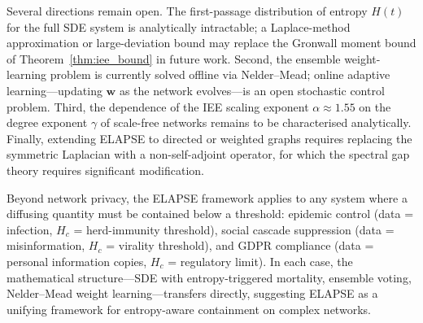 Several directions remain open. The first-passage distribution of entropy
$H(t)$ for the full SDE system is analytically
intractable; a Laplace-method approximation or large-deviation bound
may replace the Gronwall moment bound of Theorem~\ref{thm:iee_bound} in
future work.
Second, the ensemble weight-learning problem is currently solved offline
via Nelder--Mead; online adaptive learning---updating $\mathbf{w}$ as
the network evolves---is an open stochastic control problem.
Third, the dependence of the IEE scaling exponent $\alpha \approx 1.55$ on
the degree exponent $\gamma$ of scale-free networks remains to be characterised
analytically.
Finally, extending ELAPSE to directed or weighted graphs requires replacing
the symmetric Laplacian with a non-self-adjoint operator, for which the
spectral gap theory requires significant modification.

Beyond network privacy, the ELAPSE framework applies to any system where
a diffusing quantity must be contained below a threshold: epidemic control
(data = infection, $H_c$ = herd-immunity threshold), social cascade
suppression (data = misinformation, $H_c$ = virality threshold), and GDPR
compliance (data = personal information copies, $H_c$ = regulatory limit).
In each case, the mathematical structure---SDE with entropy-triggered
mortality, ensemble voting, Nelder--Mead weight learning---transfers
directly, suggesting ELAPSE as a unifying framework for entropy-aware
containment on complex networks.
